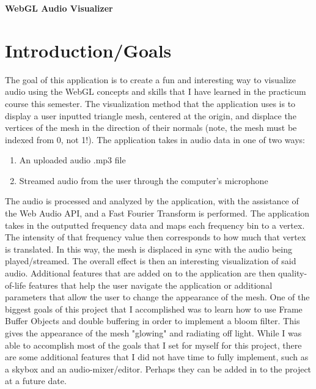 \documentclass[12pt]{article}
\begin{document}
\setlength{\parindent}{0in}
\addtolength{\parskip}{0.1cm}
\setlength{\fboxrule}{.5mm}\setlength{\fboxsep}{1.2mm}
\newlength{\boxlength}\setlength{\boxlength}{\textwidth}
\addtolength{\boxlength}{-4mm}
\begin{center}
\end{center}


{\LARGE \bf WebGL Audio Visualizer}


\section{Introduction/Goals}
The goal of this application is to create a fun and interesting way to visualize audio using the WebGL concepts and skills that I have learned in the practicum course this semester. The visualization method that the application uses is to display a user inputted triangle mesh, centered at the origin, and displace the vertices of the mesh in the direction of their normals (note, the mesh must be indexed from 0, not 1!). The application takes in audio data in one of two ways:
\begin{enumerate}[1.)]
	\item An uploaded audio .mp3 file
	\item Streamed audio from the user through the computer's microphone
\end{enumerate}
The audio is processed and analyzed by the application, with the assistance of the Web Audio API, and a Fast Fourier Transform is performed. The application takes in the outputted frequency data and maps each frequency bin to a vertex. The intensity of that frequency value then corresponds to how much that vertex is translated. In this way, the mesh is displaced in sync with the audio being played/streamed. The overall effect is then an interesting visualization of said audio. Additional features that are added on to the application are then quality-of-life features that help the user navigate the application or additional parameters that allow the user to change the appearance of the mesh. One of the biggest goals of this project that I accomplished was to learn how to use Frame Buffer Objects and double buffering in order to implement a bloom filter. This gives the appearance of the mesh "glowing" and radiating off light. While I was able to accomplish most of the goals that I set for myself for this project, there are some additional features that I did not have time to fully implement, such as a skybox and an audio-mixer/editor. Perhaps they can be added in to the project at a future date.
\end{document}

